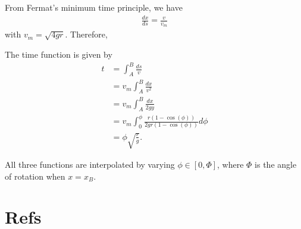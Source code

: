 \documentclass{article}
\begin{document}
From Fermat’s minimum time principle, we have
\begin{align}
  \frac{dx}{ds} = \frac{v}{v_m}
\end{align}
with $v_m = \sqrt{4gr}$. Therefore,

The time function is given by
\begin{align}
  t &= \int_{A}^{B} \frac{ds}{v}\\
  & = v_m \int_{A}^{B} \frac{dx}{v^2}\\
  & = v_m \int_{A}^{B} \frac{dx}{2 gy}\\
  & = v_m \int_{0}^{\phi} \frac{r(1 - \cos(\phi))}{2 gr(1-\cos(\phi))}d\phi\\
  & = \phi \sqrt{\frac rg}.
\end{align}

All three functions are interpolated by varying $\phi\in [0,\Phi]$, where $\Phi$ is the angle of rotation when $x=x_B$.


\section*{Refs}

\end{document}
